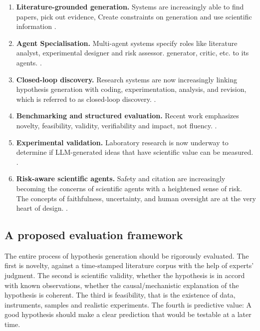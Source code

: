 \documentclass[acmsmall,screen,review]{acmart}
\begin{document}
\begin{enumerate}
  \item \textbf{Literature-grounded generation.} Systems are increasingly able to find papers, pick out evidence,
  Create constraints on generation and use scientific information
  \cite{zhou2024hypothesis,wang2024scimon,qi2024biomedical}.

  \item \textbf{Agent Specialisation.} Multi-agent systems specify roles like literature analyst, experimental designer and risk assessor. generator, critic, etc. to its agents.
  \cite{su2025many,gottweis2025towards}.

  \item \textbf{Closed-loop discovery.} Research systems are now increasingly linking hypothesis generation with coding, experimentation, analysis, and revision, which is referred to as closed-loop discovery.
  \cite{lu2024ai,yamada2026towards,gottweis2025towards,boiko2023autonomous}.

  \item \textbf{Benchmarking and structured evaluation.} Recent work emphasizes novelty, feasibility, validity, verifiability and impact, not fluency.
  \cite{si2025novel,guo2025ideabench,qi2024biomedical}.

  \item \textbf{Experimental validation.} Laboratory research is now underway to determine if LLM-generated ideas that have scientific value can be measured.
  \cite{virtuallab2024,boiko2023autonomous,scientific2025laboratory}.

  \item \textbf{Risk-aware scientific agents.} Safety and citation are increasingly becoming the concerns of scientific agents with a heightened sense of risk.
  The concepts of faithfulness, uncertainty, and human oversight are at the very heart of design.
  \cite{goo2026citation,safescientist2025,hong2024metagpt}.
\end{enumerate}


\subsection{A proposed evaluation framework}
\label{subsec:evaluation-framework}

The entire process of hypothesis generation should be rigorously evaluated. The first is novelty, against a time-stamped literature corpus with the help of experts' judgment. The second is scientific validity, whether the hypothesis is in accord with known observations, whether the causal/mechanistic explanation of the hypothesis is coherent. The third is feasibility, that is the existence of data, instruments, samples and realistic experiments. The fourth is predictive value: A good hypothesis should make a clear prediction that would be testable at a later time.
\end{document}
